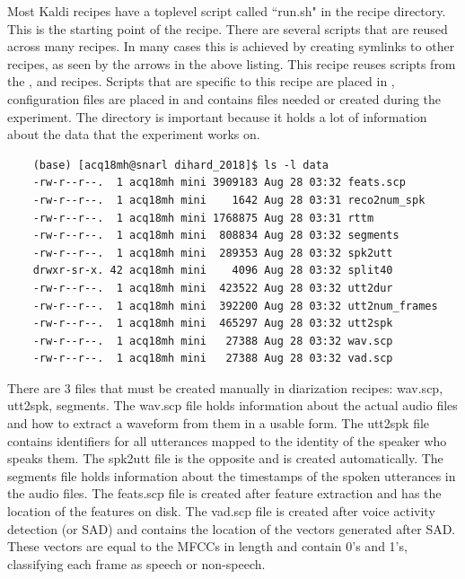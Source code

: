 	Most Kaldi recipes have a toplevel script called ``run.sh" in the recipe directory. This is the starting point of the recipe. There are several scripts that are reused across many recipes. In many cases this is achieved by creating symlinks to other recipes, as seen by the arrows in the above listing. This recipe reuses scripts from the ,  and  recipes. Scripts that are specific to this recipe are placed in , configuration files are placed in  and  contains files needed or created during the experiment. The  directory is important because it holds a lot of information about the data that the experiment works on.
	
	\begin{verbatim}
	(base) [acq18mh@snarl dihard_2018]$ ls -l data
	-rw-r--r--.  1 acq18mh mini 3909183 Aug 28 03:32 feats.scp
	-rw-r--r--.  1 acq18mh mini    1642 Aug 28 03:31 reco2num_spk
	-rw-r--r--.  1 acq18mh mini 1768875 Aug 28 03:31 rttm
	-rw-r--r--.  1 acq18mh mini  808834 Aug 28 03:32 segments
	-rw-r--r--.  1 acq18mh mini  289353 Aug 28 03:32 spk2utt
	drwxr-sr-x. 42 acq18mh mini    4096 Aug 28 03:32 split40
	-rw-r--r--.  1 acq18mh mini  423522 Aug 28 03:32 utt2dur
	-rw-r--r--.  1 acq18mh mini  392200 Aug 28 03:32 utt2num_frames
	-rw-r--r--.  1 acq18mh mini  465297 Aug 28 03:32 utt2spk
	-rw-r--r--.  1 acq18mh mini   27388 Aug 28 03:32 wav.scp
	-rw-r--r--.  1 acq18mh mini   27388 Aug 28 03:32 vad.scp
	\end{verbatim}
	
	There are 3 files that must be created manually in diarization recipes: wav.scp, utt2spk, segments. The wav.scp file holds information about the actual audio files and how to extract a waveform from them in a usable form. The utt2spk file contains identifiers for all utterances mapped to the identity of the speaker who speaks them. The spk2utt file is the opposite and is created automatically. The segments file holds information about the timestamps of the spoken utterances in the audio files. The feats.scp file is created after feature extraction and has the location of the features on disk. The vad.scp file is created after voice activity detection (or SAD) and contains the location of the vectors generated after SAD. These vectors are equal to the MFCCs in length and contain 0's and 1's, classifying each frame as speech or non-speech.

